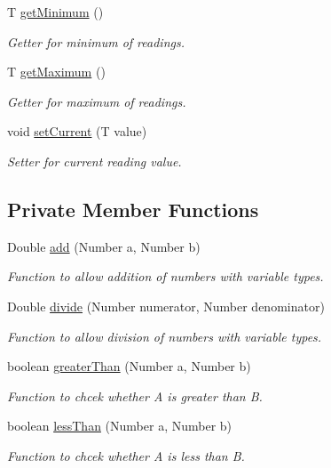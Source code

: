 \begin{DoxyCompactItemize}
T \hyperlink{classcom_1_1jack_1_1motorbikestatistics_1_1_data_item_a45cdf3ef773c9c1e69d12861deaccec0}{get\+Minimum} ()
\begin{DoxyCompactList}\small\item\em Getter for minimum of readings. \end{DoxyCompactList}\item 
T \hyperlink{classcom_1_1jack_1_1motorbikestatistics_1_1_data_item_a5d58df64d90e56c7bb7e8aa8bf49aa0f}{get\+Maximum} ()
\begin{DoxyCompactList}\small\item\em Getter for maximum of readings. \end{DoxyCompactList}\item 
void \hyperlink{classcom_1_1jack_1_1motorbikestatistics_1_1_data_item_abdeab9f088a2a78f66ac852993b555ca}{set\+Current} (T value)
\begin{DoxyCompactList}\small\item\em Setter for current reading value. \end{DoxyCompactList}\end{DoxyCompactItemize}
\subsection*{Private Member Functions}
\begin{DoxyCompactItemize}
\item 
Double \hyperlink{classcom_1_1jack_1_1motorbikestatistics_1_1_data_item_a4a5ad17bfa8a12bc05f6c02de92d6b36}{add} (Number a, Number b)
\begin{DoxyCompactList}\small\item\em Function to allow addition of numbers with variable types. \end{DoxyCompactList}\item 
Double \hyperlink{classcom_1_1jack_1_1motorbikestatistics_1_1_data_item_aab2f3e4b1cfbceb79b6477020798c417}{divide} (Number numerator, Number denominator)
\begin{DoxyCompactList}\small\item\em Function to allow division of numbers with variable types. \end{DoxyCompactList}\item 
boolean \hyperlink{classcom_1_1jack_1_1motorbikestatistics_1_1_data_item_a05da757bcb7a824c289a401c8e645264}{greater\+Than} (Number a, Number b)
\begin{DoxyCompactList}\small\item\em Function to chcek whether A is greater than B. \end{DoxyCompactList}\item 
boolean \hyperlink{classcom_1_1jack_1_1motorbikestatistics_1_1_data_item_af8d81a7e3c07f7c3a02035c872159388}{less\+Than} (Number a, Number b)
\begin{DoxyCompactList}\small\item\em Function to chcek whether A is less than B. \end{DoxyCompactList}\end{DoxyCompactItemize}
